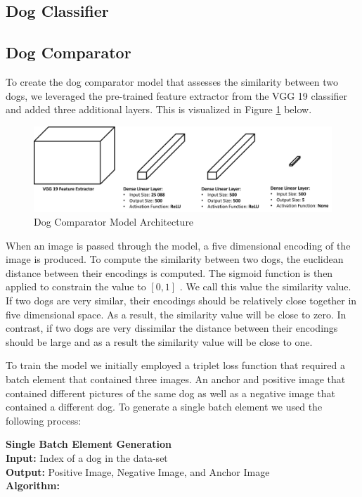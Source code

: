 \documentclass{article}
\begin{document}
\subsection{Dog Classifier}

\subsection{Dog Comparator}
To create the dog comparator model that assesses the similarity between two dogs, we leveraged the pre-trained feature extractor from the VGG 19 classifier \cite{SimonyanKaren2014VDCN} and added three additional layers.  This is visualized in Figure \ref{fig:x comparator} below.

\begin{figure}[h]
\centering
	\includegraphics[scale=0.4]{final-report-images/dog_comparator.png}
\caption{Dog Comparator Model Architecture}
\label{fig:x comparator}
\end{figure}

\noindent When an image is passed through the model, a five dimensional encoding of the image is produced.  To compute the similarity between two dogs, the euclidean distance between their encodings is computed.  The sigmoid function is then applied to constrain the value to $[0,1]$ .  We call this value the similarity value.  If two dogs are very similar, their encodings should be relatively close together in five dimensional space.  As a result, the similarity value will be close to zero.  In contrast, if two dogs are very dissimilar the distance between their encodings should be large and as a result the similarity value will be close to one.  

To train the model we initially employed a triplet loss function that required a batch element that contained three images.  An anchor and positive image that contained different pictures of the same dog as well as a negative image that contained a different dog.  To generate a single batch element we used the following process: \\


    \begin{minipage}{1\textwidth}%
     \noindent \textbf{Single Batch Element Generation}  \\
    
      \noindent \textbf{Input:} Index of a dog in the data-set \\
      
      \noindent \textbf{Output:} Positive Image, Negative Image, and Anchor Image \\
      
      \noindent \textbf{Algorithm:} \\
    \end{minipage}%
    
\end{document}
